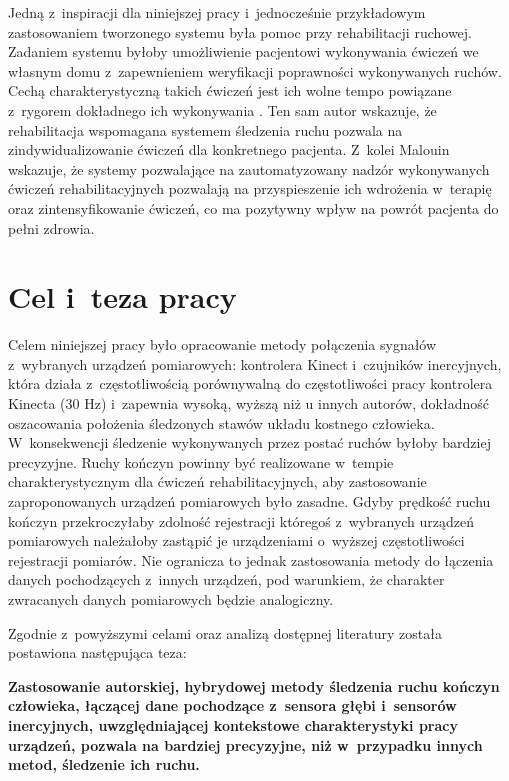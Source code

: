 Jedną z~inspiracji dla niniejszej pracy i~jednocześnie przykładowym zastosowaniem tworzonego systemu była pomoc przy rehabilitacji ruchowej. Zadaniem systemu byłoby umożliwienie pacjentowi wykonywania ćwiczeń we własnym domu z~zapewnieniem weryfikacji poprawności wykonywanych ruchów. Cechą charakterystyczną takich ćwiczeń jest ich wolne tempo powiązane z~rygorem dokładnego ich wykonywania \cite{Reinkensmeyer2012}. Ten sam autor wskazuje, że rehabilitacja wspomagana systemem śledzenia ruchu pozwala na zindywidualizowanie ćwiczeń dla konkretnego pacjenta. Z~kolei Malouin \cite{Malouin2003} wskazuje, że systemy pozwalające na zautomatyzowany nadzór wykonywanych ćwiczeń rehabilitacyjnych pozwalają na przyspieszenie ich wdrożenia w~terapię oraz zintensyfikowanie ćwiczeń, co ma pozytywny wpływ na powrót pacjenta do pełni zdrowia.

\section{Cel i~teza pracy}
Celem niniejszej pracy było opracowanie metody połączenia sygnałów z~wybranych urządzeń pomiarowych: kontrolera Kinect i~czujników inercyjnych, która działa z~częstotliwością porównywalną do częstotliwości pracy kontrolera Kinecta (30 Hz) i~zapewnia wysoką, wyższą niż u innych autorów, dokładność oszacowania położenia śledzonych stawów układu kostnego człowieka. W~konsekwencji śledzenie wykonywanych przez postać ruchów byłoby bardziej precyzyjne. Ruchy kończyn powinny być realizowane w~tempie charakterystycznym dla ćwiczeń rehabilitacyjnych, aby zastosowanie zaproponowanych urządzeń pomiarowych było zasadne. Gdyby prędkość ruchu kończyn przekroczyłaby zdolność rejestracji któregoś z~wybranych urządzeń pomiarowych należałoby zastąpić je urządzeniami o~wyższej częstotliwości rejestracji pomiarów. Nie ogranicza to jednak zastosowania metody do łączenia danych pochodzących z~innych urządzeń, pod warunkiem, że charakter zwracanych danych pomiarowych będzie analogiczny. 

Zgodnie z~powyższymi celami oraz analizą dostępnej literatury została postawiona następująca teza:\\
\begin{center}
	\textbf{Zastosowanie autorskiej, hybrydowej metody śledzenia ruchu kończyn człowieka, łączącej dane pochodzące z~sensora głębi i~sensorów inercyjnych, uwzględniającej kontekstowe charakterystyki pracy urządzeń, pozwala na bardziej precyzyjne, niż w~przypadku innych metod, śledzenie ich ruchu.}
\end{center}

